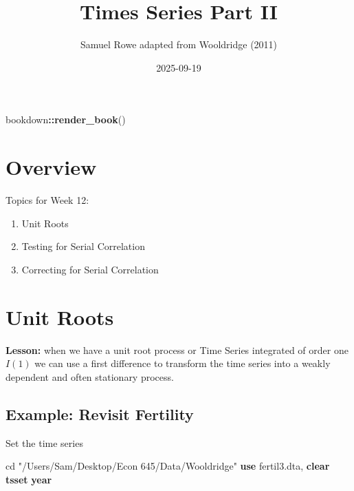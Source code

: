 \documentclass[
]{book}
\title{Times Series Part II}
\author{Samuel Rowe adapted from Wooldridge (2011)}
\date{2025-09-19}
\newenvironment{Shaded}{\begin{snugshade}}{\end{snugshade}}
\newcommand{\FunctionTok}[1]{\textcolor[rgb]{0.13,0.29,0.53}{\textbf{#1}}}
\newcommand{\KeywordTok}[1]{\textcolor[rgb]{0.13,0.29,0.53}{\textbf{#1}}}
\newcommand{\NormalTok}[1]{#1}
\newcommand{\SpecialCharTok}[1]{\textcolor[rgb]{0.81,0.36,0.00}{\textbf{#1}}}
\newcommand{\StringTok}[1]{\textcolor[rgb]{0.31,0.60,0.02}{#1}}
\providecommand{\tightlist}{%
  \setlength{\itemsep}{0pt}\setlength{\parskip}{0pt}}
\begin{document}
\maketitle

{
\setcounter{tocdepth}{1}
\tableofcontents
}
\begin{Shaded}
\begin{Highlighting}[]
\NormalTok{bookdown}\SpecialCharTok{::}\FunctionTok{render\_book}\NormalTok{()}
\end{Highlighting}
\end{Shaded}

\chapter*{Overview}\label{overview}

Topics for Week 12:

\begin{enumerate}
\def\labelenumi{\arabic{enumi}.}
\tightlist
\item
  Unit Roots
\item
  Testing for Serial Correlation
\item
  Correcting for Serial Correlation
\end{enumerate}

\chapter{Unit Roots}\label{unit-roots}

\textbf{Lesson:} when we have a unit root process or Time Series integrated of order one \(I(1)\)
we can use a first difference to transform the time series into a weakly dependent
and often stationary process.

\section{Example: Revisit Fertility}\label{example-revisit-fertility}

Set the time series

\begin{Shaded}
\begin{Highlighting}[]
\NormalTok{cd }\StringTok{"/Users/Sam/Desktop/Econ 645/Data/Wooldridge"}
\KeywordTok{use}\NormalTok{ fertil3.dta, }\KeywordTok{clear}
\KeywordTok{tsset} \FunctionTok{year}
\end{Highlighting}
\end{Shaded}
\end{document}
